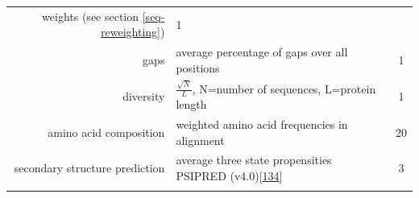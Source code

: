 \documentclass[12pt,a4paper,twoside]{book}
\theoremstyle{definition}
\theoremstyle{definition}
\theoremstyle{remark}
\begin{document}
\begin{longtable}[]{@{}rlc@{}}
\begin{minipage}[t]{0.50\columnwidth}
weights (see section \ref{seq-reweighting})\strut
\end{minipage} & \begin{minipage}[t]{0.18\columnwidth}\centering\strut
1\strut
\end{minipage}\tabularnewline
\begin{minipage}[t]{0.23\columnwidth}\raggedleft\strut
gaps\strut
\end{minipage} & \begin{minipage}[t]{0.50\columnwidth}\raggedright\strut
average percentage of gaps over all positions\strut
\end{minipage} & \begin{minipage}[t]{0.18\columnwidth}\centering\strut
1\strut
\end{minipage}\tabularnewline
\begin{minipage}[t]{0.23\columnwidth}\raggedleft\strut
diversity\strut
\end{minipage} & \begin{minipage}[t]{0.50\columnwidth}\raggedright\strut
\(\frac{\sqrt{N}}{L}\), N=number of sequences, L=protein length\strut
\end{minipage} & \begin{minipage}[t]{0.18\columnwidth}\centering\strut
1\strut
\end{minipage}\tabularnewline
\begin{minipage}[t]{0.23\columnwidth}\raggedleft\strut
amino acid composition\strut
\end{minipage} & \begin{minipage}[t]{0.50\columnwidth}\raggedright\strut
weighted amino acid frequencies in alignment\strut
\end{minipage} & \begin{minipage}[t]{0.18\columnwidth}\centering\strut
20\strut
\end{minipage}\tabularnewline
\begin{minipage}[t]{0.23\columnwidth}\raggedleft\strut
secondary structure prediction\strut
\end{minipage} & \begin{minipage}[t]{0.50\columnwidth}\raggedright\strut
average three state propensities PSIPRED
(v4.0){[}\protect\hyperlink{ref-Jones1999}{134}{]}\strut
\end{minipage} & \begin{minipage}[t]{0.18\columnwidth}\centering\strut
3\strut
\end{minipage}\tabularnewline
\begin{minipage}[t]{0.23\columnwidth}\raggedleft\strut

\end{minipage}
\end{longtable}
\end{document}
